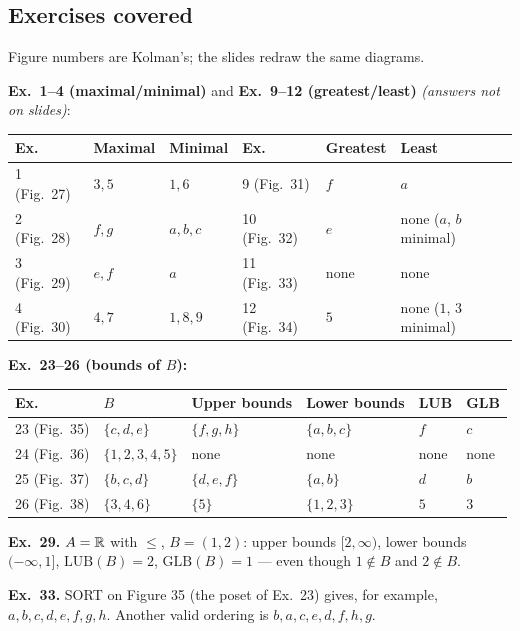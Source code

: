 \documentclass{fkt-notes}
\theoremstyle{definition}
\begin{document}
\subsection{Exercises covered}
Figure numbers are Kolman's; the slides redraw the same diagrams.

\noindent\textbf{Ex.~1--4 (maximal/minimal)} and \textbf{Ex.~9--12
  (greatest/least)} \emph{(answers not on slides)}:\\[2pt]
\begin{tabular}{@{}lll@{\qquad}lll@{}}
  \toprule
  Ex.         & Maximal & Minimal & Ex.          & Greatest & Least                   \\
  \midrule
  1 (Fig.~27) & $3,5$   & $1,6$   & 9 (Fig.~31)  & $f$      & $a$                     \\
  2 (Fig.~28) & $f,g$   & $a,b,c$ & 10 (Fig.~32) & $e$      & none ($a$, $b$ minimal) \\
  3 (Fig.~29) & $e,f$   & $a$     & 11 (Fig.~33) & none     & none                    \\
  4 (Fig.~30) & $4,7$   & $1,8,9$ & 12 (Fig.~34) & $5$      & none ($1$, $3$ minimal) \\
  \bottomrule
\end{tabular}

\medskip
\noindent\textbf{Ex.~23--26 (bounds of $B$):}\\[2pt]
\begin{tabular}{@{}llllll@{}}
  \toprule
  Ex.          & $B$             & Upper bounds & Lower bounds & LUB  & GLB  \\
  \midrule
  23 (Fig.~35) & $\{c,d,e\}$     & $\{f,g,h\}$  & $\{a,b,c\}$  & $f$  & $c$  \\
  24 (Fig.~36) & $\{1,2,3,4,5\}$ & none         & none         & none & none \\
  25 (Fig.~37) & $\{b,c,d\}$     & $\{d,e,f\}$  & $\{a,b\}$    & $d$  & $b$  \\
  26 (Fig.~38) & $\{3,4,6\}$     & $\{5\}$      & $\{1,2,3\}$  & $5$  & $3$  \\
  \bottomrule
\end{tabular}

\medskip
\noindent\textbf{Ex.~29.} $A=\mathbb{R}$ with $\le$, $B=(1,2)$: upper bounds
$[2,\infty)$, lower bounds $(-\infty,1]$, $\mathrm{LUB}(B)=2$,
$\mathrm{GLB}(B)=1$ --- even though $1\notin B$ and $2\notin B$.

\noindent\textbf{Ex.~33.} SORT on Figure 35 (the poset of Ex.~23)
gives, for example, $a,b,c,d,e,f,g,h$. Another valid ordering is
$b,a,c,e,d,f,h,g$.
\end{document}

